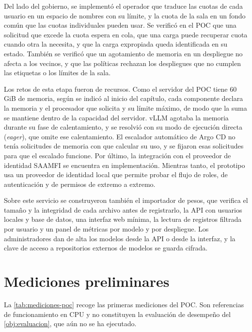 Del lado del gobierno, se implementó el operador que traduce las cuotas de cada usuario en un espacio de nombres con su límite, y la cuota de la sala en un fondo común que las cuotas individuales pueden usar. Se verificó en el POC que una solicitud que excede la cuota espera en cola, que una carga puede recuperar cuota cuando otra la necesita, y que la carga expropiada queda identificada en su estado. También se verificó que un agotamiento de memoria en un despliegue no afecta a los vecinos, y que las políticas rechazan los despliegues que no cumplen las etiquetas o los límites de la sala.

Los retos de esta etapa fueron de recursos. Como el servidor del POC tiene 60\,GiB de memoria, según se indicó al inicio del capítulo, cada componente declara la memoria y el procesador que solicita y su límite máximo, de modo que la suma se mantiene dentro de la capacidad del servidor. vLLM agotaba la memoria durante su fase de calentamiento, y se resolvió con su modo de ejecución directa (\emph{eager}), que omite ese calentamiento. El escalador automático de Argo CD no tenía solicitudes de memoria con que calcular su uso, y se fijaron esas solicitudes para que el escalado funcione. Por último, la integración con el proveedor de identidad SAAMFI se encuentra en implementación. Mientras tanto, el prototipo usa un proveedor de identidad local que permite probar el flujo de roles, de autenticación y de permisos de extremo a extremo.

Sobre este servicio se construyeron también el importador de pesos, que verifica el tamaño y la integridad de cada archivo antes de registrarlo, la API con usuarios locales y base de datos, una interfaz web mínima, la lectura de registros filtrada por usuario y un panel de métricas por modelo y por despliegue. Los administradores dan de alta los modelos desde la API o desde la interfaz, y la clave de acceso a repositorios externos de modelos se guarda cifrada.

\section{Mediciones preliminares}\label{sec:avance-mediciones}

La \cref{tab:mediciones-poc} recoge las primeras mediciones del POC. Son referencias de funcionamiento en CPU y no constituyen la evaluación de desempeño del \cref{obj:evaluacion}, que aún no se ha ejecutado.

